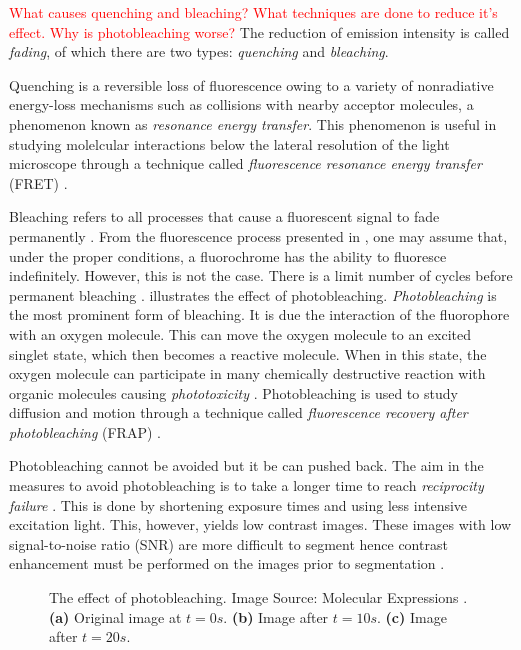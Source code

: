 \begin{definition}[Fading]
	\textcolor{red}{What causes quenching and bleaching? What techniques are done to reduce it's effect. Why is photobleaching worse?}
	The reduction of emission intensity is called \textit{fading}, of which there are two types: \textit{quenching} and \textit{bleaching}.
	
	Quenching is a reversible loss of fluorescence owing to a variety of nonradiative energy-loss mechanisms such as collisions with nearby acceptor molecules, a phenomenon known as \textit{resonance energy transfer}.
	This phenomenon is useful in studying molelcular interactions below the lateral resolution of the light microscope through a technique called \textit{fluorescence resonance energy transfer} (FRET) \cite{Spring2003,Danek2012,LichtmanConchello2005}.
	
	Bleaching refers to all processes that cause a fluorescent signal to fade permanently \citep{LichtmanConchello2005}.
	From the fluorescence process presented in , one may assume that, under the proper conditions, a fluorochrome has the ability to fluoresce indefinitely.
	However, this is not the case. There is a limit number of cycles before permanent bleaching \citep{LichtmanConchello2005}.
	 illustrates the effect of photobleaching.
	\textit{Photobleaching} is the most prominent form of bleaching.
	It is due the interaction of the fluorophore with an oxygen molecule.
	This can move the oxygen molecule to an excited singlet state, which then becomes a reactive molecule.
	When in this state, the oxygen molecule can participate in many chemically destructive reaction with organic molecules causing \textit{phototoxicity} \citep{Danek2012}.
	Photobleaching is used to study diffusion and motion through a technique called \textit{fluorescence recovery after photobleaching} (FRAP) \citep{LichtmanConchello2005,AbramowitzDavidson2016}.
	
	Photobleaching cannot be avoided but it be can pushed back.
	The aim in the measures to avoid photobleaching is to take a longer time to reach \textit{reciprocity failure} \citep{AbramowitzDavidson2016}.
	This is done by shortening exposure times and using less intensive excitation light.
	This, however, yields low contrast images.
	These images with low signal-to-noise \citep{Murphy2001} ratio (SNR) are more difficult to segment hence contrast enhancement must be performed on the images prior to segmentation \citep{Boppart2005}.
	\begin{figure}[!t]
		\centering
		\caption{The effect of photobleaching. Image Source: Molecular Expressions \citep{MolecularExpressionsPhotobleaching}. 
			\textbf{(a)} Original image at $t=0s$.
			\textbf{(b)} Image after $t=10s$.
			\textbf{(c)} Image after $t=20s$.
			}
		\label{fig:bleaching}
	\end{figure}
\end{definition}

